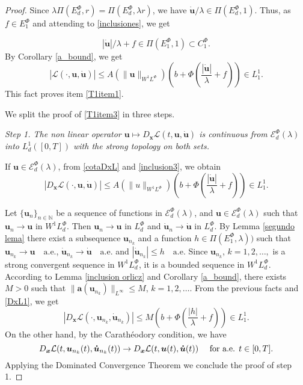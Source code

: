 \documentclass[twoside]{article}
\theoremstyle{remark}
\newcommand{\lphi}{L^{\Phi}}
\newcommand{\ephi}{E^{\Phi}}
\newcommand{\claseor}{C^{\Phi}}
\newcommand{\wphi}{W^{1}\lphi}
\newcommand{\sobnor}{\|_{W^{1}\lphi}}
\newcommand{\domi}{\mathcal{E}^{\Phi}_d(\lambda)}
\renewcommand{\b}[1]{\boldsymbol{#1}}
\renewcommand{\leq}{\leqslant}
\begin{document}
\begin{proof}
 Since  $\lambda\Pi(\ephi_d,r)=\Pi(\ephi_d,\lambda r)$, we have   $\b{\dot{u}}/\lambda\in\Pi(\ephi_d,1)$. 
Thus, as $f\in\ephi_1$ and attending to \eqref{inclusiones}, we get 

\begin{equation}\label{inclusion3}
|\b{\dot{u}}|/\lambda+f\in\Pi(\ephi_1,1)\subset \claseor_1.
\end{equation}
By Corollary \ref{a_bound}, we get 
 \[|\mathcal{L}(\cdot,\b{u},\b{\dot{u}})| \leq A(\|\b{u}\sobnor ) \left(b+ \Phi\left (\frac{|\b{\dot{u}}|}{\lambda}+f\right)  \right)\in
 L^1_1.\]
This fact proves item \ref{T1item1}.

 We split the proof of  \ref{T1item3} in three steps.

\noindent\emph{Step 1. The non linear operator  $\b{u} \mapsto D_{\b{x}}\mathcal{L}(t,\b{u},\b{\dot{u}})$ is continuous from $\domi$ into $L^{1}_d([0,T])$ with the strong topology on both sets.} 


If $\b{u}\in \domi$, from \eqref{cotaDxL} and \eqref{inclusion3}, we obtain 
\begin{equation}\label{DxL1}
|D_{\b{x}}\mathcal{L}(\cdot,\b{u},\b{\dot{u}})|\leq A(\|u\sobnor) \left(b+\Phi\left(\frac{|\b{\dot{u}}|}{\lambda}+f\right)\right) \in L^1_1.
\end{equation}


Let   $\{\b{u}_n\}_{n\in \mathbb{N}}$ be a sequence of  functions in $\domi$, and $\b{u}\in \domi$ such that $\b{u}_n\rightarrow \b{u}$ in $\wphi_d$.
Then $\b{u}_n\rightarrow \b{u}$ in $\lphi_d$ and $\b{\dot{u}}_n\rightarrow \b{\dot{u}}$ in $\lphi_d$. By Lemma \ref{segundo lema} there exist a subsequence $\b{u}_{n_k}$ and a function  $h\in \Pi(\ephi_1,\lambda))$
such that $\b{u}_{n_k}\rightarrow \b{u} \quad\text{a.e.}$, $\b{\dot{u}}_{n_k}\rightarrow \b{\dot{u}} \quad\text{a.e.}$ and $|\b{\dot{u}}_{n_k}|\leq h\quad\text{a.e}$.  Since $\b{u}_{n_k}$, $k=1,2,\ldots,$ is a strong convergent sequence in $\wphi_d$, it is a bounded sequence in $\wphi_d$. According to Lemma \ref{inclusion orlicz} and Corollary \ref{a_bound}, there exists $M>0$ such that $\|\b{a}(\b{u}_{n_k})\|_{L^{\infty}} \leq M$, $k=1,2,\ldots$.  From the previous facts and \eqref{DxL1}, we get
\begin{equation*}\label{DxL1-bis}
|D_{\b{x}}\mathcal{L}(\cdot,\b{u}_{n_k},\b{\dot{u}}_{n_k})|\leq M\left(b+\Phi\left(\frac{|h|}{\lambda}+f\right)\right) \in L^1_1.
\end{equation*}
On the other hand, by the Carath\'eodory condition, we have
\[D_{\b{x}}\mathcal{L}(t,\b{u}_{n_k}(t),\b{\dot{u}}_{n_k}(t))\to D_{\b{x}}\mathcal{L}(t,\b{u}(t),\b{\dot{u}}(t))\quad\hbox{ for a.e. } t\in[0,T].\]
Applying the Dominated Convergence Theorem we conclude the proof of step 1.


\end{proof}
\end{document}
